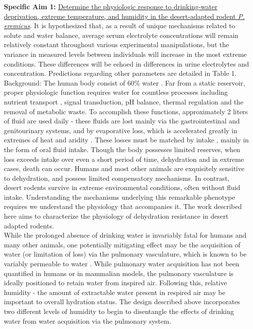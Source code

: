 \documentclass[11pt]{article}
\begin{document}
\vspace{3mm}

\noindent \textbf{Specific Aim 1:} \ul{Determine the physiologic response to drinking-water deprivation, extreme temperature, and humidity in the desert-adapted rodent \textit{P. eremicus}}. It is hypothesized that, as a result of unique mechanisms related to solute and water balance, average serum electrolyte concentrations will remain relatively constant throughout various experimental manipulations, but the variance in measured levels between individuals will increase in the most extreme conditions. These differences will be echoed in differences in urine electrolytes and concentration. Predictions regarding other parameters are detailed in Table 1. \\

Background: The human body consist of 60\% water \citep{Jequier:2009cz}. Far from a static reservoir, proper physiologic function requires water for countless processes including nutrient transport \citep{Haussinger:1996wl}, signal transduction, pH balance, thermal regulation \citep{Montain:1999ux} and the removal of metabolic waste. To accomplish these functions, approximately 2 liters of fluid are used daily - these fluids are lost mainly via the gastrointestinal and genitourinary systems, and by evaporative loss, which is accelerated greatly in extremes of heat and aridity \citep{Cheuvront:2010eg}. These losses must be matched by intake \citep{Jequier:2009cz}, mainly in the form of oral fluid intake. Though the body possesses limited reserves, when loss exceeds intake over even a short period of time, dehydration and in extreme cases, death can occur. Humans and most other animals are exquisitely sensitive to dehydration, and possess limited compensatory mechanisms. In contrast, desert rodents survive in extreme environmental conditions, often without fluid intake. Understanding the mechanisms underlying this remarkable phenotype requires we understand the physiology that accompanies it. The work described here aims to characterize the physiology of dehydration resistance in desert adapted rodents. \\

While the prolonged absence of drinking water is invariably fatal for humans and many other animals, one potentially mitigating effect may be the acquisition of water (or limitation of loss) via the pulmonary vasculature, which is known to be variably permeable to water \citep{Berger:2011ks,Goralski:2010eo}. While pulmonary water acquisition has not been quantified in humans or in mammalian models, the pulmonary vasculature is ideally positioned to retain water from inspired air. Following this, relative humidity -  the amount of extractable water present in respired air may be important to overall hydration status. The design described above incorporates two different levels of humidity to begin to disentangle the effects of drinking water from water acquisition via the pulmonary system. \\
  
\end{document}
